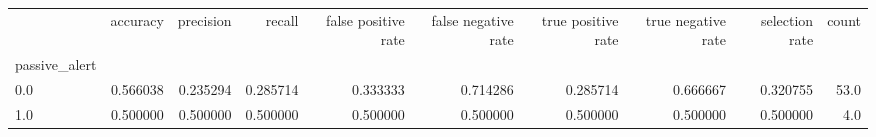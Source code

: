 \begin{tabular}{lrrrrrrrrr}
\toprule
{} &  accuracy &  precision &    recall &  false positive rate &  false negative rate &  true positive rate &  true negative rate &  selection rate &  count \\
passive\_alert &           &            &           &                      &                      &                     &                     &                 &        \\
\midrule
0.0           &  0.566038 &   0.235294 &  0.285714 &             0.333333 &             0.714286 &            0.285714 &            0.666667 &        0.320755 &   53.0 \\
1.0           &  0.500000 &   0.500000 &  0.500000 &             0.500000 &             0.500000 &            0.500000 &            0.500000 &        0.500000 &    4.0 \\
\bottomrule
\end{tabular}
